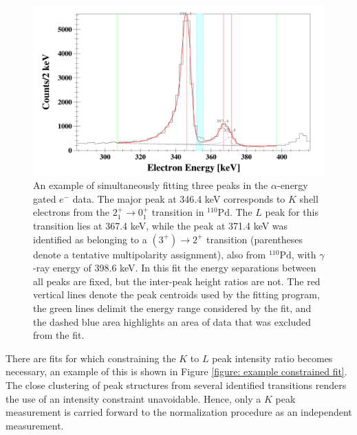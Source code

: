 \begin{figure}[!ht]
  \centering
  \includegraphics[width=\textwidth]{techniques_fit_example.png}
  \caption[An example of simultaneously fitting three peaks in the $\alpha$-energy gated $e^-$ data. The $K$ to $L$ peak intensity ratios are unconstrained.]{An example of simultaneously fitting three peaks in the $\alpha$-energy gated $e^-$ data. The major peak at 346.4 keV corresponds to $K$ shell electrons from the $2^+_1 \rightarrow 0^+_1$ transition in $^{110}\mathrm{Pd}$. The $L$ peak for this transition lies at 367.4 keV, while the peak at 371.4 keV was identified as belonging to a $(3^+) \rightarrow 2^+$ transition (parentheses denote a tentative multipolarity assignment), also from $^{110}\mathrm{Pd}$, with $\gamma$-ray energy of 398.6 keV. In this fit the energy separations between all peaks are fixed, but the inter-peak height ratios are not. The red vertical lines denote the peak centroids used by the fitting program, the green lines delimit the energy range considered by the fit, and the dashed blue area highlights an area of data that was excluded from the fit.}
  \label{figure: example 2 to 0 fit}
\end{figure}

There are fits for which constraining the $K$ to $L$ peak intensity ratio becomes necessary, an example of this is shown in Figure \ref{figure: example constrained fit}. The close clustering of peak structures from several identified transitions renders the use of an intensity constraint unavoidable. Hence, only a $K$ peak measurement is carried forward to the normalization procedure as an independent measurement. 

